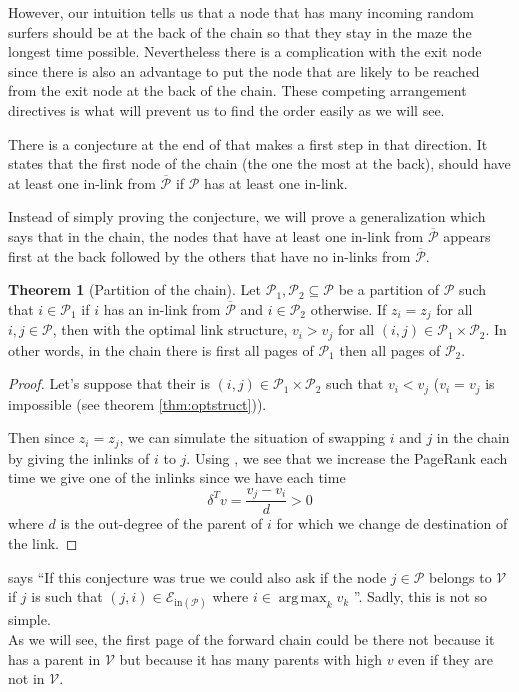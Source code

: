 \documentclass{article}
\DeclareMathOperator*{\argmax}{arg\,max}
\newcommand{\1}{\mathbf{1}}
\theoremstyle{definition}
\newtheorem{mytheo}[mydef]{Theorem}
\begin{document}
However, our intuition tells us that a node that has many incoming random surfers should be at the back
of the chain so that they stay in the maze the longest time possible.
Nevertheless there is a complication with the exit node since there is also an advantage to put the node that are
likely to be reached from the exit node at the back of the chain.
These competing arrangement directives is what will prevent us to find the order easily as we will see.

There is a conjecture at the end of \cite{de2008maximizing} that makes a first step in that direction.
It states that the first node of the chain (the one the most at the back), should have at least one in-link from $\overline{\mathcal{P}}$
if $\mathcal{P}$ has at least one in-link.

Instead of simply proving the conjecture, we will prove a generalization
which says that in the chain, the nodes that have at least one in-link from $\overline{\mathcal{P}}$ appears first at the back
followed by the others that have no in-links from $\overline{\mathcal{P}}$.
\begin{mytheo}[Partition of the chain]
  \label{theo:partition}
  Let \(\mathcal{P}_1,\mathcal{P}_2 \subseteq \mathcal{P}\) be a partition of \(\mathcal{P}\) such that
  \(i \in \mathcal{P}_1\) if \(i\) has an in-link from \(\overline{\mathcal{P}}\) and \(i \in \mathcal{P}_2\)
  otherwise.
  If \(z_i = z_j\) for all \(i,j \in \mathcal{P}\),
  then with the optimal link structure,
  \(v_i > v_j\) for all \((i,j) \in \mathcal{P}_1 \times \mathcal{P}_2\).
  In other words, in the chain there is first all pages of
  \(\mathcal{P}_1\) then all pages of \(\mathcal{P}_2\).
  \begin{proof}
    Let's suppose that their is \((i,j) \in \mathcal{P}_1 \times \mathcal{P}_2\)
    such that \(v_i < v_j\) (\(v_i = v_j\) is impossible (see theorem \ref{thm:optstruct})).

    Then since \(z_i = z_j\), we can simulate the situation of swapping \(i\) and \(j\) in the chain
    by giving the inlinks of \(i\) to \(j\).
    Using \cite[theorem~5]{de2008maximizing}, we see that we increase the PageRank each time we give one of the inlinks since
    we have each time
    \[ \delta^Tv = \frac{v_j - v_i}{d} > 0 \]
    where \(d\) is the out-degree of the parent of \(i\) for which we change de destination of the link.
  \end{proof}
\end{mytheo}

\cite{de2008maximizing} says
``If this conjecture was true we could also ask if the node \(j \in \mathcal{P}\) belongs to \(\mathcal{V}\) if \(j\) is such that
\((j, i) \in \mathcal{E}_{\text{in}(\mathcal{P})}\) where \(i \in \argmax_k v_k\) ''.
Sadly, this is not so simple. \\
As we will see, the first page of the forward chain could be there not
because it has a parent in \(\mathcal{V}\) but because it has many parents with high \(v\) even if they are not in \(\mathcal{V}\).
\end{document}
